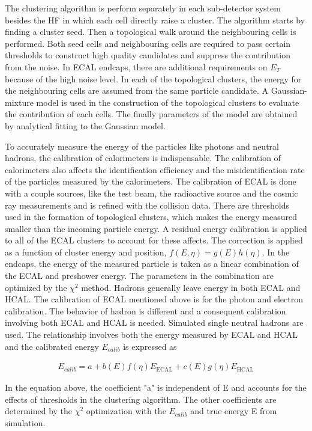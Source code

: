 The clustering algorithm is perform separately in each sub-detector system besides the HF in which each cell directly raise a cluster. The algorithm starts by finding a cluster seed. Then a topological walk around the neighbouring cells is performed. Both seed cells and neighbouring cells are required to pass certain thresholds to construct high quality candidates and suppress the contribution from the noise. In ECAL endcaps, there are additional requirements on $E_{T}$ because of the high noise level. In each of the topological clusters, the energy for the neighbouring cells are assumed from the same particle candidate. A Gaussian-mixture model is used in the construction of the topological clusters to evaluate the contribution of each cells. The finally parameters of the model are obtained by analytical fitting to the Gaussian model.

To accurately measure the energy of the particles like photons and neutral hadrons, the calibration of calorimeters is indispensable. The calibration of calorimeters also affects the identification efficiency and the misidentification rate of the particles measured by the calorimeters. The calibration of ECAL is done with a couple sources, like the test beam, the radioactive source and the cosmic ray measurements and is refined with the collision data. There are thresholds used in the formation of topological clusters, which makes the energy measured smaller than the incoming particle energy. A residual energy calibration is applied to all of the ECAL clusters to account for these affects.  The correction is applied as a function of cluster energy and position, $f(E,\eta)=g(E)h(\eta)$. In the endcaps, the energy of the measured particle is taken as a linear combination of the ECAL and preshower energy. The parameters in the combination are optimized by the $\chi^{2}$ method. Hadrons generally leave energy in both ECAL and HCAL. The calibration of ECAL mentioned above is for the photon and electron calibration. The behavior of hadron is different and a consequent calibration involving both ECAL and HCAL is needed. Simulated single neutral hadrons are used. The relationship involves both the energy measured by ECAL and HCAL and the calibrated energy $E_{calib}$ is expressed as

\begin{align*}
E_{calib}=a+b(E)f(\eta)E_{\textrm{ECAL}}+c(E)g(\eta)E_{\textrm{HCAL}}
\end{align*}

In the equation above, the coefficient "a" is independent of E and accounts for the effects of thresholds in the clustering algorithm. The other coefficients are determined by the $\chi^{2}$ optimization with the $E_{calib}$ and true energy E from simulation. 


